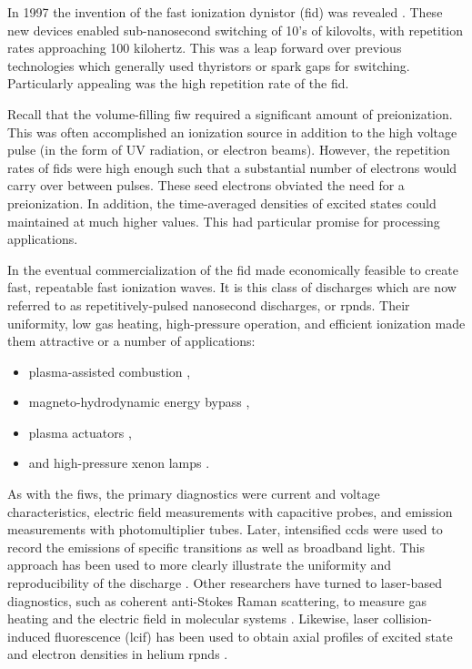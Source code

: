 In 1997 the invention of the fast ionization dynistor (\acs{fid}) was revealed
\cite{Efanov1997}. These new devices enabled sub-nanosecond switching of 10's of
kilovolts, with repetition rates approaching 100 kilohertz. This was a leap
forward over previous technologies which generally used thyristors or spark gaps
for switching. Particularly appealing was the high repetition rate of the
\acs{fid}.

Recall that the volume-filling \acs{fiw} required a significant
amount of preionization. This was often accomplished an ionization source in
addition to the high voltage pulse (in the form of UV radiation, or electron
beams). However, the repetition rates of \acs{fid}s were high enough such that a
substantial number of electrons would carry over between pulses. These seed
electrons obviated the need for a preionization. In addition, the time-averaged
densities of excited states could maintained at much higher values. This had
particular promise for processing applications.

In the eventual commercialization of the \acs{fid} made economically feasible to
create fast, repeatable fast ionization waves. It is this class of discharges
which are now referred to as repetitively-pulsed nanosecond discharges, or
\acs{rpnd}s. Their uniformity, low gas heating, high-pressure operation, and
efficient ionization made them attractive or a number of applications:
\begin{itemize}
  \item plasma-assisted combustion \cite{Starikovskaia2006},
  \item magneto-hydrodynamic energy bypass \cite{Macheret2002},
  \item plasma actuators \cite{Adamovich2009},
  \item and high-pressure xenon lamps \cite{Nikandrov2008, Tsendin2009}.
\end{itemize}

As with the \acs{fiw}s, the primary diagnostics were current and voltage
characteristics, electric field measurements with capacitive probes, and
emission measurements with photomultiplier tubes. Later, intensified \acs{ccd}s
were used to record the emissions of specific transitions as well as broadband
light. This approach has been used to more clearly illustrate the uniformity and
reproducibility of the discharge \cite{Adamovich2009}. Other researchers have
turned to laser-based diagnostics, such as coherent anti-Stokes Raman
scattering, to measure gas heating \cite{Zuzeek2010} and the electric field in
molecular systems \cite{Ito2010, Ito2010a}. Likewise, laser collision-induced
fluorescence (\acs{lcif}) has been used to obtain axial profiles of excited
state and electron densities in helium \acs{rpnd}s \cite{Weatherford2012}.

